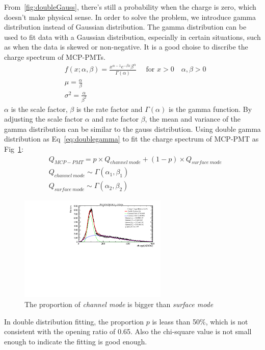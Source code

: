 \documentclass{article}
\begin{document}
From~\ref{fig:doubleGauss}, there's still a probability when the charge is zero, which doesn't make physical sense.
In order to solve the problem, we introduce gamma distribution instead of Gaussian distribution.
The gamma distribution can be used to fit data with a Gaussian distribution, especially in certain situations,
such as when the data is skewed or non-negative. It is a good choise to discribe the charge spectrum of MCP-PMTs.
\begin{equation}
    \label{eq:gamma}
    \begin{aligned}
         & f(x ; \alpha, \beta)=\frac{x^{\alpha-1} e^{-\beta x} \beta^\alpha}{\Gamma(\alpha)} \quad \text { for } x>0 \quad \alpha, \beta>0 \\
         & \mu=\frac{\alpha}{\beta}                                                                                                         \\
         & \sigma^2=\frac{\alpha}{\beta^2}
    \end{aligned}
\end{equation}
$\alpha$ is the scale factor, $\beta$ is the rate factor and $\Gamma(\alpha)$ is the gamma function.
By adjusting the scale factor $\alpha$ and rate factor $\beta$, the mean and variance of the gamma distribution can be similar to the gauss distribution.
Using double gamma distribution as Eq~\ref{eq:doublegamma} to fit the charge spectrum of MCP-PMT as Fig~\ref{fig:doubleGamma}:
\begin{equation}
    \label{eq:doublegamma}
    \begin{aligned}
         & Q_{MCP-PMT} = p\times Q_{channel\  mode} + (1-p)\times Q_{surface\  mode} \\
         & Q_{channel\  mode} \sim \varGamma  (\alpha_1, \beta_1)                    \\
         & Q_{surface\  mode} \sim \varGamma  (\alpha_2, \beta_2)
    \end{aligned}
\end{equation}
\begin{figure}[ht]
    \centering
    \includegraphics[height=5cm]{pic/doubleGamma.pdf}
    \caption{The proportion of \textit{channel mode} is bigger than \textit{surface mode}}\label{fig:doubleGamma}
\end{figure}
In double distribution fitting, the proportion $p$ is leass than 50\%, which is not consistent with the opening ratio of 0.65.
Also the chi-square value is not small enough to indicate the fitting is good enough.
\end{document}
